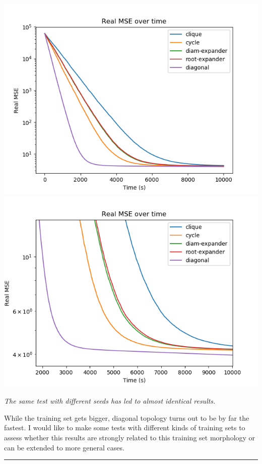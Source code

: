 \documentclass[11pt]{article}
\makeatletter
\def\maxwidth{\ifdim\Gin@nat@width>\linewidth\linewidth
    \else\Gin@nat@width\fi}
\let\Oldincludegraphics\includegraphics
\renewcommand{\includegraphics}[1]{\Oldincludegraphics[width=.8\maxwidth]{#1}}
\makeatother
\begin{document}
\includegraphics{media/img/tests/test_003_100ksamples_classic/3_real-mse_time.png}
\includegraphics{media/img/tests/test_003_100ksamples_classic/3_real-mse_time_zoom.png}

\emph{The same test with different seeds has led to almost identical
results.}

    While the training set gets bigger, diagonal topology turns out to be by
far the fastest. I would like to make some tests with different kinds of
training sets to assess whether this results are strongly related to
this training set morphology or can be extended to more general cases.

    \begin{center}\rule{0.5\linewidth}{\linethickness}\end{center}
\end{document}
